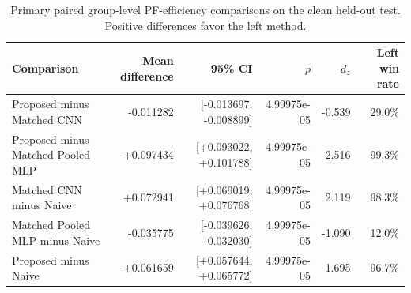\begin{table}[t]
\centering
\caption{Primary paired group-level PF-efficiency comparisons on the clean held-out test. Positive differences favor the left method.}
\label{tab:matched_clean_paired}
\begin{tabular}{lrrrrr}
\toprule
Comparison & Mean difference & 95\% CI & $p$ & $d_z$ & Left win rate \\
\midrule
Proposed minus Matched CNN & -0.011282 & [-0.013697, -0.008899] & 4.99975e-05 & -0.539 & 29.0\% \\
Proposed minus Matched Pooled MLP & +0.097434 & [+0.093022, +0.101788] & 4.99975e-05 & 2.516 & 99.3\% \\
Matched CNN minus Naive & +0.072941 & [+0.069019, +0.076768] & 4.99975e-05 & 2.119 & 98.3\% \\
Matched Pooled MLP minus Naive & -0.035775 & [-0.039626, -0.032030] & 4.99975e-05 & -1.090 & 12.0\% \\
Proposed minus Naive & +0.061659 & [+0.057644, +0.065772] & 4.99975e-05 & 1.695 & 96.7\% \\
\bottomrule
\end{tabular}
\end{table}